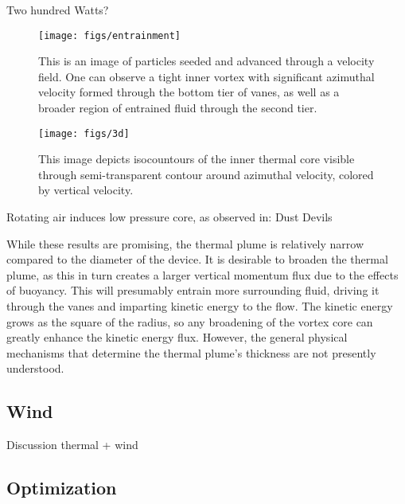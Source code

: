 Two hundred Watts?

  \begin{figure}[htp]

   \centering   
   \begin{minipage}{0.47\textwidth}
    \texttt{[image: figs/entrainment]}%
    \caption{This is an image of particles seeded and advanced
    through a velocity field. One can observe a tight inner vortex with
    significant azimuthal velocity formed through the bottom tier of
    vanes, as well as a broader region of entrained fluid through the
    second tier.} 
   \end{minipage}   
   
   \centering
   \begin{minipage}{0.47\textwidth}
    \texttt{[image: figs/3d]}
    \caption{This image depicts isocountours of the inner thermal core
    visible through semi-transparent contour around azimuthal velocity,
    colored by vertical velocity. }
   \end{minipage}      
   \label{fig:entrain}  
  \end{figure}



Rotating air induces low pressure core, as observed in:
Dust Devils

%
%
While these results are promising, the thermal plume is relatively
narrow compared to the diameter of the device. It is desirable to
broaden the thermal plume, as this in turn creates a larger vertical
momentum flux due to the effects of buoyancy. This will presumably
entrain more surrounding fluid, driving it through the vanes and
imparting kinetic energy to the flow. The kinetic energy grows as the
square of the radius, so any broadening of the vortex core can greatly
enhance the kinetic energy flux. However, the general physical
mechanisms that determine the thermal plume's thickness are not
presently understood. 

\subsection{Wind}

Discussion thermal + wind

\subsection{Optimization}

%
%
